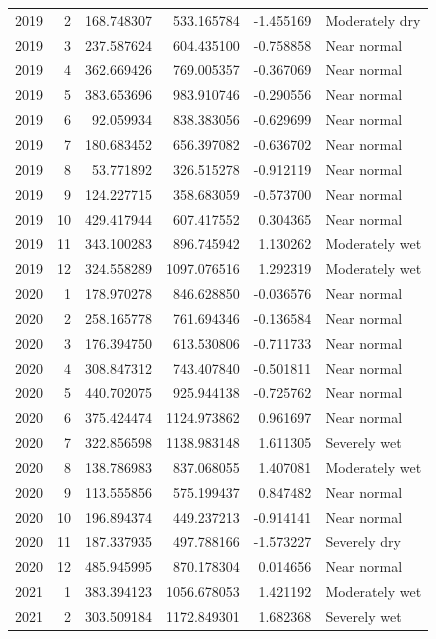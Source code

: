 \begin{tabular}{rrrrrl}
2019 & 2 & 168.748307 & 533.165784 & -1.455169 & Moderately dry \\
2019 & 3 & 237.587624 & 604.435100 & -0.758858 & Near normal \\
2019 & 4 & 362.669426 & 769.005357 & -0.367069 & Near normal \\
2019 & 5 & 383.653696 & 983.910746 & -0.290556 & Near normal \\
2019 & 6 & 92.059934 & 838.383056 & -0.629699 & Near normal \\
2019 & 7 & 180.683452 & 656.397082 & -0.636702 & Near normal \\
2019 & 8 & 53.771892 & 326.515278 & -0.912119 & Near normal \\
2019 & 9 & 124.227715 & 358.683059 & -0.573700 & Near normal \\
2019 & 10 & 429.417944 & 607.417552 & 0.304365 & Near normal \\
2019 & 11 & 343.100283 & 896.745942 & 1.130262 & Moderately wet \\
2019 & 12 & 324.558289 & 1097.076516 & 1.292319 & Moderately wet \\
2020 & 1 & 178.970278 & 846.628850 & -0.036576 & Near normal \\
2020 & 2 & 258.165778 & 761.694346 & -0.136584 & Near normal \\
2020 & 3 & 176.394750 & 613.530806 & -0.711733 & Near normal \\
2020 & 4 & 308.847312 & 743.407840 & -0.501811 & Near normal \\
2020 & 5 & 440.702075 & 925.944138 & -0.725762 & Near normal \\
2020 & 6 & 375.424474 & 1124.973862 & 0.961697 & Near normal \\
2020 & 7 & 322.856598 & 1138.983148 & 1.611305 & Severely wet \\
2020 & 8 & 138.786983 & 837.068055 & 1.407081 & Moderately wet \\
2020 & 9 & 113.555856 & 575.199437 & 0.847482 & Near normal \\
2020 & 10 & 196.894374 & 449.237213 & -0.914141 & Near normal \\
2020 & 11 & 187.337935 & 497.788166 & -1.573227 & Severely dry \\
2020 & 12 & 485.945995 & 870.178304 & 0.014656 & Near normal \\
2021 & 1 & 383.394123 & 1056.678053 & 1.421192 & Moderately wet \\
2021 & 2 & 303.509184 & 1172.849301 & 1.682368 & Severely wet \\

\end{tabular}
